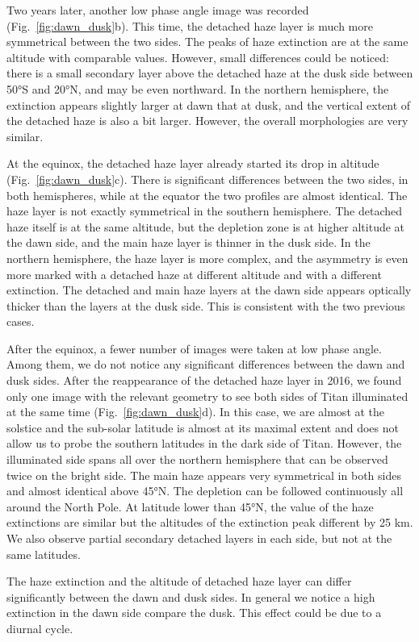Two years later, another low phase angle image was recorded (Fig.~\ref{fig:dawn_dusk}b).
This time, the detached haze layer is much more symmetrical between the two sides. The peaks of haze extinction
are at the same altitude with comparable values. However, small differences could be noticed: there is a
small secondary layer above the detached haze at the dusk side between \ang{50}S and \ang{20}N, and may be even
northward. In the northern hemisphere, the extinction appears slightly larger at dawn that at dusk, and the
vertical extent of the detached haze is also a bit larger. However, the overall morphologies are very similar.

At the equinox, the detached haze layer already started its drop in altitude (Fig.~\ref{fig:dawn_dusk}c).
There is significant differences between the two sides, in both hemispheres, while at the equator the two
profiles are almost identical. The haze layer is not exactly symmetrical in the southern hemisphere. The detached
haze itself is at the same altitude, but the depletion zone is at higher altitude at the dawn side, and the main
haze layer is thinner in the dusk side. In the northern hemisphere, the haze layer is more complex, and the
asymmetry is even more marked with a detached haze at different altitude and with a different extinction. The
detached and main haze layers at the dawn side appears optically thicker than the layers at the dusk side.
This is consistent with the two previous cases.

After the equinox, a fewer number of images were taken at low phase angle. Among them, we do not notice any
significant differences between the dawn and dusk sides. After the reappearance of the detached haze layer in
2016, we found only one image with the relevant geometry to see both sides of Titan illuminated at the same time
(Fig.~\ref{fig:dawn_dusk}d). In this case, we are almost at the solstice and the sub-solar latitude is almost
at its maximal extent and does not allow us to probe the southern latitudes in the dark side of Titan.
However, the illuminated side spans all over the northern hemisphere that can
be observed twice on the bright side. The main haze appears very symmetrical in both sides and almost identical
above \ang{45}N. The depletion can be followed continuously all around the North Pole. At latitude lower than
\ang{45}N, the value of the haze extinctions are similar but the altitudes of the extinction peak different by
25 km. We also observe partial secondary detached layers in each side, but not at the same latitudes.

The haze extinction and the altitude of detached haze layer can differ significantly between the dawn
and dusk sides. In general we notice a high extinction in the dawn side compare the dusk. This effect
could be due to a diurnal cycle.